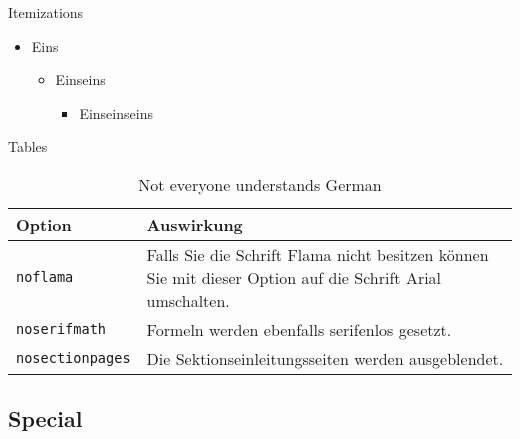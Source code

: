 \documentclass{beamer}
\begin{document}
\begin{frame}{Itemizations}
\begin{itemize}
	\item Eins
	\begin{itemize}
		\item Einseins
		\begin{itemize}
			\item Einseinseins
		\end{itemize}
	\end{itemize}
\end{itemize}
\end{frame}

\begin{frame}{Tables}
\begin{table}[]
	\begin{tabularx}{\linewidth}{l>{\raggedright}X}
			\toprule
			\textbf{Option}			& \textbf{Auswirkung} \tabularnewline
			\midrule
			\texttt{noflama}		& Falls Sie die Schrift Flama nicht besitzen können Sie mit dieser Option auf die Schrift Arial umschalten. \tabularnewline
			\texttt{noserifmath}		& Formeln werden ebenfalls serifenlos gesetzt. \tabularnewline
			\texttt{nosectionpages} & Die Sektionseinleitungsseiten werden ausgeblendet.\tabularnewline
			\bottomrule
	\end{tabularx}
	\caption{Not everyone understands German}
\end{table}
\end{frame}

\subsection{Special}
\end{document}
